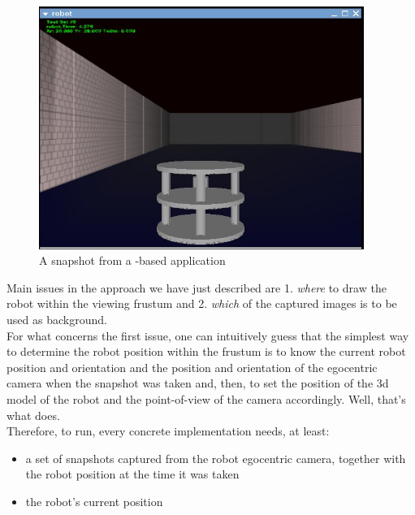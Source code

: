 \begin{figure}[!h]
  \begin{center}
    \includegraphics[width=300pt]{img/rear_snapshot_large.jpg}
    \caption{A snapshot from a \framework{}-based application}
    \label{fig:snap}
  \end{center}
\end{figure}

Main issues in the approach we have just described are 1. 
\textit{where} to draw the robot within the viewing frustum 
and 2. \textit{which} of the captured images is to be used 
as background.
\\
For what concerns the first issue, one can intuitively guess 
that the simplest way to determine the robot position 
within the frustum is to know the current robot position 
and orientation and the position and orientation of the egocentric 
camera when the snapshot was taken and, then, to set the 
position of the 3d model of the robot and the point-of-view 
of the camera accordingly.
Well, that's what \framework{} does.
\\
Therefore, to run, every \framework{} concrete implementation 
needs, at least:

\begin{itemize}
  \item a set of snapshots captured from the robot egocentric camera, 
    together with the robot position at the time it was taken
  \item the robot's current position
\end{itemize}

